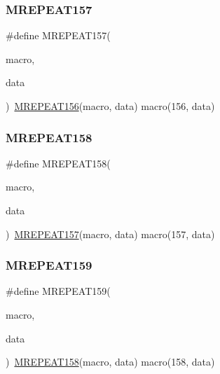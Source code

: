 \mbox{\label{group__group__sam0__utils__mrepeat_gac6c7099162fd3b9ad60c2e4ff69b6bf1}} 
\subsubsection{\texorpdfstring{MREPEAT157}{MREPEAT157}}
{\footnotesize\ttfamily \#define M\+R\+E\+P\+E\+A\+T157(\begin{DoxyParamCaption}\item[{}]{macro,  }\item[{}]{data }\end{DoxyParamCaption})~\mbox{\hyperlink{group__group__sam0__utils__mrepeat_ga4608d896f8fb7879075ba32ad5b687f9}{M\+R\+E\+P\+E\+A\+T156}}(macro, data)   macro(156, data)}

\mbox{\label{group__group__sam0__utils__mrepeat_ga76360eeb95fe2f07db4e54f3b56c3fef}} 
\subsubsection{\texorpdfstring{MREPEAT158}{MREPEAT158}}
{\footnotesize\ttfamily \#define M\+R\+E\+P\+E\+A\+T158(\begin{DoxyParamCaption}\item[{}]{macro,  }\item[{}]{data }\end{DoxyParamCaption})~\mbox{\hyperlink{group__group__sam0__utils__mrepeat_gac6c7099162fd3b9ad60c2e4ff69b6bf1}{M\+R\+E\+P\+E\+A\+T157}}(macro, data)   macro(157, data)}

\mbox{\label{group__group__sam0__utils__mrepeat_ga0ffc3b60afa702e0588da2e00ddb9e7e}} 
\subsubsection{\texorpdfstring{MREPEAT159}{MREPEAT159}}
{\footnotesize\ttfamily \#define M\+R\+E\+P\+E\+A\+T159(\begin{DoxyParamCaption}\item[{}]{macro,  }\item[{}]{data }\end{DoxyParamCaption})~\mbox{\hyperlink{group__group__sam0__utils__mrepeat_ga76360eeb95fe2f07db4e54f3b56c3fef}{M\+R\+E\+P\+E\+A\+T158}}(macro, data)   macro(158, data)}

